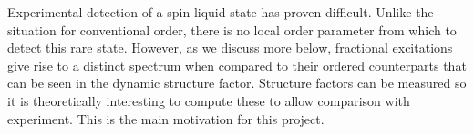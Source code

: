 \documentclass[aps,pra,preprint,groupedaddress]{revtex4-1}
\newcommand{\1}{\mathds{1}}
\begin{document}
 



Experimental detection of a spin liquid state has proven difficult. Unlike the situation for conventional order, there is no local order parameter from which to detect this rare state. However, as we discuss more below, fractional excitations give rise to a distinct spectrum when compared to their ordered counterparts that can be seen in the dynamic structure factor. Structure factors can be measured so it is theoretically interesting to compute these to allow comparison with experiment. This is the main motivation for this project. %
\end{document}
